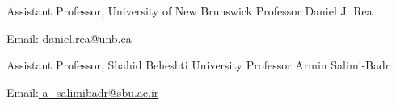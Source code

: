 \begin{cventries}

    \cventry
    {Assistant Professor, University of New Brunswick}
    {Professor Daniel J. Rea}
    {}
    {}
    {
      \begin{cvitems}
	    \item{Email:\href{mailto:daniel.rea@unb.ca}{ daniel.rea{@}unb.ca}}
      \end{cvitems}
    }
    \vspace{0.2 cm}


    \cventry
    {Assistant Professor, Shahid Beheshti University}
    {Professor Armin Salimi-Badr}
    {}
    {}
    {
      \begin{cvitems}
	    \item{Email:\href{mailto:a_salimibadr@sbu.ac.ir}{ a\_salimibadr{@}sbu.ac.ir}}
      \end{cvitems}
    }




\end{cventries}
